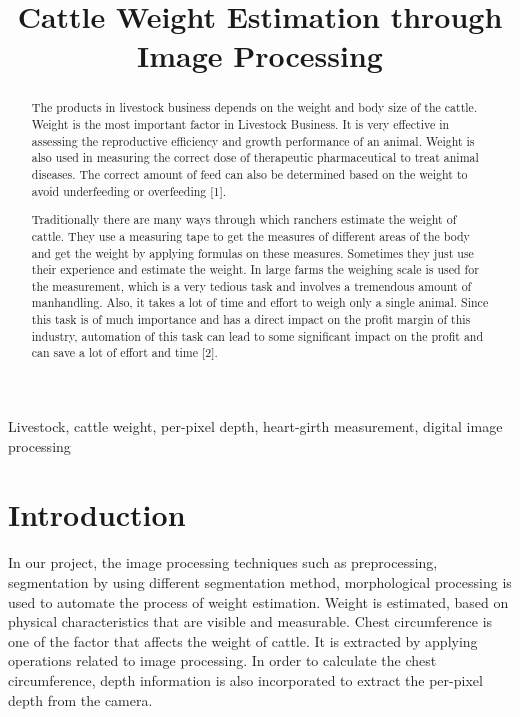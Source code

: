 \documentclass{article}
\title{Cattle Weight Estimation through Image Processing}
\begin{document}
%

\maketitle
%
\begin{abstract}
The products in livestock business depends on the weight and body size of the cattle. Weight is the most important factor in Livestock Business. It is very effective in assessing the reproductive efficiency and growth performance of an animal. Weight is also used in measuring the correct dose of therapeutic pharmaceutical to treat animal diseases. The correct amount of feed can also be determined based on the weight to avoid underfeeding or overfeeding [1].

Traditionally there are many ways through which ranchers estimate the weight of cattle. They use a measuring tape to get the measures of different areas of the body and get the weight by applying formulas on these measures. Sometimes they just use their experience and estimate the weight. In large farms the weighing scale is used for the measurement, which is a very tedious task and involves a tremendous amount of manhandling. Also, it takes a lot of time and effort to weigh only a single animal. Since this task is of much importance and has a direct impact on the profit margin of this industry, automation of this task can lead to some significant impact on the profit and can save a lot of effort and time [2]. 
\end{abstract}
%
\begin{keywords}
Livestock, cattle weight, per-pixel depth, heart-girth measurement, digital image processing  
\end{keywords}
%
\section{Introduction}
\label{sec:intro}

In our project, the image processing techniques such as preprocessing, segmentation by using different segmentation method, morphological processing is used to automate the process of weight estimation. Weight is estimated, based on physical characteristics that are visible and measurable. Chest circumference is one of the factor that affects the weight of cattle. It is extracted by applying operations related to image processing. In order to calculate the chest circumference, depth information is also incorporated to extract the per-pixel depth from the camera. 
\end{document}
